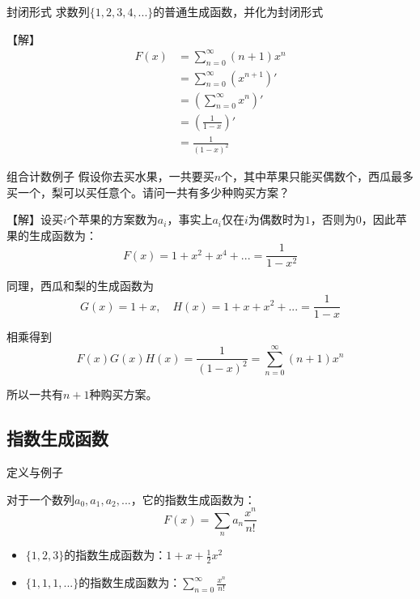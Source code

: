 \documentclass{beamer}
\begin{document}
\begin{frame}{封闭形式}
    求数列$\{1,2,3,4,...\}$的普通生成函数，并化为封闭形式

    \vspace{1em}\pause
    【解】
    \begin{align*}
        F(x)&=\sum_{n=0}^\infty (n+1)x^{n}\\
        &= \sum_{n=0}^\infty (x^{n+1})'\\
        &= \left(\sum_{n=0}^\infty x^{n}\right)'\\
        &= \left(\frac{1}{1-x}\right)'\\
        &= \frac{1}{(1-x)^2}
    \end{align*}
\end{frame}

\begin{frame}{组合计数例子}
    \small
    假设你去买水果，一共要买$n$个，其中苹果只能买偶数个，西瓜最多买一个，梨可以买任意个。请问一共有多少种购买方案？

    \vspace{1em}\pause
    【解】设买$i$个苹果的方案数为$a_i$，事实上$a_i$仅在$i$为偶数时为$1$，否则为$0$，因此苹果的生成函数为：
    \begin{equation*}
        F(x)=1+x^2+x^4+...=\frac{1}{1-x^2}
    \end{equation*}

    \pause
    同理，西瓜和梨的生成函数为
    \begin{equation*}
        G(x)=1+x,\quad H(x)=1+x+x^2+...=\frac{1}{1-x}
    \end{equation*}

    \pause
    相乘得到
    \begin{equation*}
        F(x)G(x)H(x)=\frac{1}{(1-x)^2}=\sum_{n=0}^\infty (n+1)x^{n}
    \end{equation*}

    所以一共有$n+1$种购买方案。
\end{frame}

\subsection{指数生成函数}

\begin{frame}{定义与例子}

对于一个数列$a_0,a_1,a_2,...$，它的指数生成函数为：
\begin{equation*}
    F(x)=\sum_n a_n\frac{x^n}{n!}
\end{equation*}

\pause
\begin{itemize}
    \item $\{1,2,3\}$的指数生成函数为：$1+x+\frac{1}{2}x^2$
    \item $\{1,1,1,...\}$的指数生成函数为：$\sum_{n=0}^\infty \frac{x^n}{n!}$
\end{itemize}

\end{frame}
\end{document}
